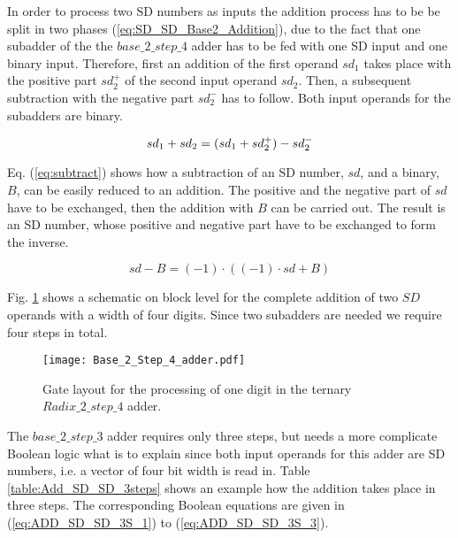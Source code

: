 \documentclass[pageno]{jpaper}
\begin{document}
In order to process two SD numbers as inputs the addition process has to be be split in two phases (\ref{eq:SD_SD_Base2_Addition}), due to the fact that one subadder of the the $base\_2\_step\_4$ adder has to be fed with one SD input and one binary input. Therefore, first an addition of the first operand $sd_1$ takes place with the positive part $sd^+_2$ of the second input operand $sd_2$. Then, a subsequent subtraction with the negative part $sd^-_2$ has to follow. Both input operands for the subadders are binary. 

\begin{equation}
\label{eq:SD_SD_Base2_Addition}
  sd_1 + sd_2 = (sd_1 + sd_2^+)-sd_2^- \\
\end{equation}

Eq. (\ref{eq:subtract}) shows how a subtraction of an SD number, $sd$, and a binary, $B$, can be easily reduced to an addition. The positive and the negative part of $sd$ have to be exchanged, then the addition with $B$ can be carried out. The result is an SD number, whose positive and negative part  have to be exchanged to form the inverse. 

\begin{equation}
\label{eq:subtract}
sd-B=\left( -1 \right) \cdot \left( \left( -1 \right) \cdot sd + B \right)
\end{equation}

Fig. \ref{fig:base_2_step_4_adder} shows a schematic on block level for the complete addition of two $SD$ operands with a width of four digits. Since two subadders are needed we require four steps in total. 

\begin{figure}[htbp]
\centering
\texttt{[image: Base\_2\_Step\_4\_adder.pdf]}
\caption{Gate layout for the processing of one digit in the ternary $Radix\_2\_step\_4$ adder.}
\label{fig:base_2_step_4_adder}
\end{figure}

The $base\_2\_step\_3$ adder requires only three steps, but needs a more complicate Boolean logic what is to explain since both input operands for this adder are SD numbers, i.e. a vector of four bit width is read in. Table \ref{table:Add_SD_SD_3steps} shows an example how the addition takes place in three steps. The corresponding Boolean equations are given in (\ref{eq:ADD_SD_SD_3S_1}) to (\ref{eq:ADD_SD_SD_3S_3}). 
\end{document}
